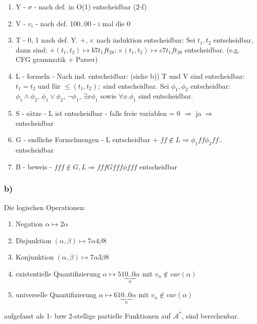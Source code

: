 \documentclass[12pt]{article}
\begin{document}
\begin{enumerate}
  \item Y - $\sigma$ - nach def. in O(1) entscheidbar (2-f)
  \item V - $v_i$ - nach def. 100..00 - i mal die 0
  \item T - 0, 1 nach def. Y. $+, \times$ nach induktion entscheidbar:
    Sei $t_1, t_2$ entscheidbar, dann sind: $+(t_1,t_2) \mapsto b7t_1ft_28; \times(t_1,t_2)\mapsto c7t_1ft_28$ entscheidbar. (e.g. CFG grammatik + Parser) 
  \item L - formeln - Nach ind. entscheidbar: (siehe b))
    T und V sind entscheidbar: $t_1=t_2$ und für $\leq(t_1,t_2);$ sind entscheidbar.
    Sei $\phi_1, \phi_2$ entscheidbar: $\phi_1\land\phi_2$, $\phi_1\lor\phi_2$, $\neg\phi_1$, $\exists x \phi_1$ sowie $\forall x. \phi_1$ sind entscheidbar.
  \item S - sätze - L ist entscheidbar - falls freie variablen = 0 $\Rightarrow$ ja $\Rightarrow $ entscheidbar
  \item G - endliche Formelmengen - L entscheidbar + $ff\notin L\Rightarrow \phi_1 ff\phi_2 ff..$ entscheidbar
  \item B - beweis - $fff\notin G,L \Rightarrow fffGfff\phi fff$ entscheidbar
\end{enumerate}

\subsubsection*{b)}
Die logischen Operationen:
\begin{enumerate}
  \item Negation $\alpha \mapsto 2\alpha$
  \item Disjunktion $(\alpha, \beta) \mapsto 7\alpha 4\beta 8$
  \item Konjunktion $(\alpha, \beta) \mapsto 7\alpha 3\beta 8$
  \item existentielle Quantifizierung $\alpha \mapsto 51\underbrace{0..0}_{n}\alpha$ mit $v_n\notin var(\alpha)$
  \item universelle Quantifizierung $\alpha \mapsto 61\underbrace{0..0}_{n}\alpha$ mit $v_n\notin var(\alpha)$

\end{enumerate}
aufgefasst als 1- bzw 2-stellige partielle Funktionen auf $\mathcal{A}^*$, 
sind berechenbar.

\end{document}
